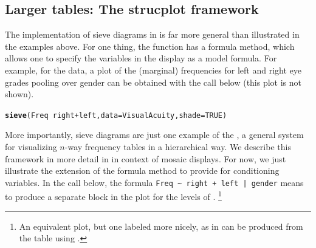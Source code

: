 \documentclass[11pt]{book}\usepackage[]{graphicx}\usepackage[]{color}
\makeatletter
\newcommand{\hlnum}[1]{\textcolor[rgb]{0.686,0.059,0.569}{#1}}%
\newcommand{\hlopt}[1]{\textcolor[rgb]{0,0,0}{#1}}%
\newcommand{\hlstd}[1]{\textcolor[rgb]{0.345,0.345,0.345}{#1}}%
\newcommand{\hlkwc}[1]{\textcolor[rgb]{0.333,0.667,0.333}{#1}}%
\newcommand{\hlkwd}[1]{\textcolor[rgb]{0.737,0.353,0.396}{\textbf{#1}}}%
\newenvironment{kframe}{%
 \def\at@end@of@kframe{}%
 \ifinner\ifhmode%
  \def\at@end@of@kframe{\end{minipage}}%
  \begin{minipage}{\columnwidth}%
 \fi\fi%
 \def\FrameCommand##1{\hskip\@totalleftmargin \hskip-\fboxsep
 \colorbox{shadecolor}{##1}\hskip-\fboxsep
     \hskip-\linewidth \hskip-\@totalleftmargin \hskip\columnwidth}%
 \MakeFramed {\advance\hsize-\width
   \@totalleftmargin\z@ \linewidth\hsize
   \@setminipage}}%
 {\par\unskip\endMakeFramed%
 \at@end@of@kframe}
\newenvironment{knitrout}{}{} %
\renewenvironment{knitrout}{\small\renewcommand{\baselinestretch}{.85}}{} %
\makeatother
\begin{document}
\subsection{Larger tables: The strucplot framework}\label{sec:twoway-sieve-larger}
The implementation of sieve diagrams in  is far more
general than illustrated in the examples above.  For one thing,
the  function has a formula method, which allows one to specify
the variables in the display as a model formula.
For example, for the  data, a plot of
the (marginal) frequencies for left and right eye grades
pooling over gender can be obtained with the call below
(this plot is not shown).

\begin{knitrout}
\color{fgcolor}\begin{kframe}
\begin{alltt}
\hlkwd{sieve}\hlstd{(Freq} \hlopt{~} \hlstd{right} \hlopt{+} \hlstd{left,}  \hlkwc{data} \hlstd{= VisualAcuity,} \hlkwc{shade}\hlstd{=}\hlnum{TRUE}\hlstd{)}
\end{alltt}
\end{kframe}
\end{knitrout}


More importantly, sieve diagrams are just one example of
the , a general system for
visualizing $n$-way frequency tables in a hierarchical
way.  We describe this framework in more detail in
 in context of mosaic
displays.  For now, we just illustrate the extension of
the formula method to provide for conditioning variables.
In the call below, the formula \verb#Freq ~ right + left | gender#
means to produce a separate block in the plot for the levels of
.%
\footnote{
An equivalent plot, but one labeled more nicely, as in 
can be produced from the  table using
.
}
\end{document}
